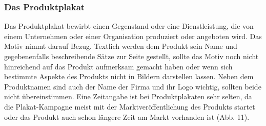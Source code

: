 \documentclass[a4paper,12pt,ngerman]{article}
\begin{document}
\subsubsection{Das Produktplakat}
Das Produktplakat bewirbt einen Gegenstand oder eine Dienstleistung, die von einem Unternehmen oder einer Organisation produziert oder angeboten wird. Das Motiv nimmt darauf Bezug. Textlich werden dem Produkt sein Name und gegebenenfalls beschreibende Sätze zur Seite gestellt, sollte das Motiv noch nicht hinreichend auf das Produkt aufmerksam gemacht haben oder wenn sich bestimmte Aspekte des Produkts nicht in Bildern darstellen lassen. Neben dem Produktnamen sind auch der Name der Firma und ihr Logo wichtig, sollten beide nicht übereinstimmen. Eine Zeitangabe ist bei Produktplakaten sehr selten, da die Plakat-Kampagne meist mit der Marktveröffentlichung des Produkts startet oder das Produkt auch schon längere Zeit am Markt vorhanden ist (Abb. 11). \\
\end{document}
